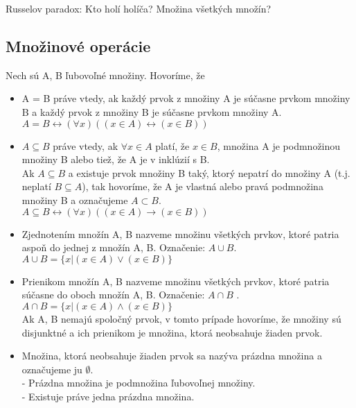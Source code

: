 	Russelov paradox: Kto holí holíča? Množina všetkých množín?
  \subsection{Množinové operácie}
  Nech sú A, B ľubovoľné množiny.
  Hovoríme, že
  \begin{itemize}
    \item A = B práve vtedy, ak každý prvok z množiny A je súčasne prvkom množiny B a každý prvok z množiny B je súčasne prvkom množiny A. \\
    $A = B \leftrightarrow  (\forall x)((x \in A) \leftrightarrow  (x \in B))$\\

    \item $A \subseteq B$ práve vtedy, ak $\forall x \in A$ platí, že $x \in B$, množina A je podmnožinou množiny B alebo tiež, že A je v inklúzií s B. \\
    Ak $A \subseteq B$ a existuje prvok množiny B taký, ktorý nepatrí do množiny A (t.j. neplatí $B \subseteq A$), tak hovoríme, že A je vlastná alebo pravá podmnožina množiny B a označujeme $A \subset B$.\\
    $A \subseteq B \leftrightarrow  (\forall x)(( x\in A) \rightarrow ( x\in B))$\\

    \item Zjednotením množín A, B nazveme množinu všetkých prvkov, ktoré patria aspoň do jednej z množín A, B. Označenie: $A \cup B$.\\
    $A \cup B = \{ x | ( x \in A) \vee ( x \in B )\}$ \\

    \item Prienikom množín A, B nazveme množinu všetkých prvkov, ktoré patria súčasne do oboch množín A, B. Označenie: $A \cap B$ .\\
    $A \cap B = \{ x | ( x \in A) \wedge ( x \in B)\} $\\
    Ak A, B nemajú spoločný prvok, v tomto prípade hovoríme, že množiny sú disjunktné a ich prienikom je množina, ktorá neobsahuje žiaden prvok.\\

    \item Množina, ktorá neobsahuje žiaden prvok sa nazýva prázdna množina a označujeme ju $\emptyset$.\\ 
      - Prázdna množina je podmnožina ľubovoľnej množiny. \\
      - Existuje práve jedna prázdna množina. \\


\end{itemize}

